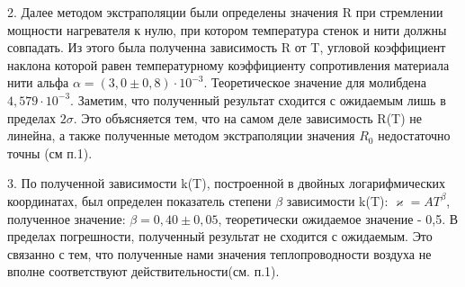 \documentclass[12pt,a4paper]{article}
\begin{document}
2. Далее методом экстраполяции были определены значения R при стремлении мощности нагревателя к нулю, при котором температура стенок и нити должны совпадать. Из этого была полученна зависимость R от T, угловой коэффициент наклона которой равен температурному коэффициенту сопротивления материала нити альфа $\alpha = (3,0 \pm 0,8) \cdot 10^{-3}$. Теоретическое значение для молибдена $4,579 \cdot 10^{-3}$. Заметим, что полученный результат сходится с ожидаемым лишь в пределах $2\sigma$. Это объясняется тем, что на самом деле зависимость R(T) не линейна, а также полученные методом экстраполяции значения $R_0$ недостаточно точны (см п.1). 

3. По полученной зависимости k(T), построенной в двойных логарифмических координатах, был определен показатель степени $\beta$  зависимости k(T): $\varkappa = AT^\beta$, полученное значение: $\beta = 0,40 \pm 0,05$, теоретически ожидаемое значение - 0,5. В пределах погрешности, полученный результат не сходится с ожидаемым. Это связанно с тем, что полученные нами значения теплопроводности воздуха  не вполне соответствуют действительности(см. п.1). 
 
 
 
\end{document}
